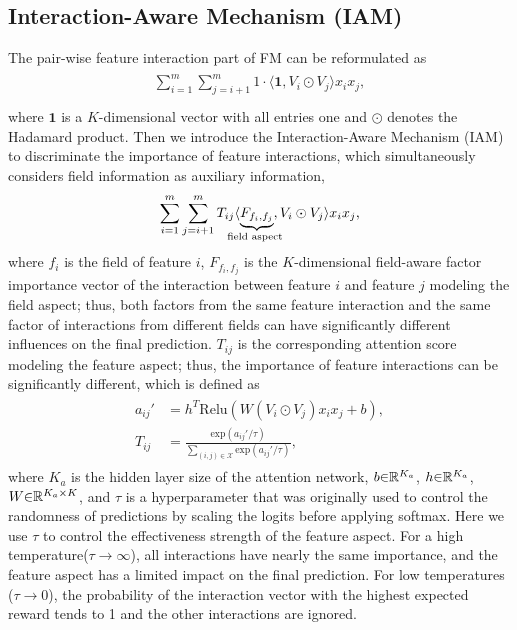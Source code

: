 \documentclass[letterpaper]{article} \usepackage{aaai19}  \usepackage{times}  \usepackage{helvet}  \usepackage{courier}  \usepackage{url}  \usepackage{graphicx}  \frenchspacing  \setlength{\pdfpagewidth}{8.5in}  \setlength{\pdfpageheight}{11in}  \usepackage{mathtools}
\begin{document}
\subsection{Interaction-Aware Mechanism (IAM)}
The pair-wise feature interaction part of FM can be reformulated as 
\begin{align}
\begin{split}
\sum_{i=1}^m\sum_{j=i+1}^{m} 1 \cdot \langle \mathbf{1}, V_i \odot V_j \rangle x_{i}x_{j}, \\ 
\end{split}
\label{eq:refm}
\end{align}
where $\mathbf{1}$ is a $K$-dimensional vector with all entries one and $\odot$ denotes the Hadamard product. Then we introduce the Interaction-Aware Mechanism (IAM) to discriminate the importance of feature interactions, which simultaneously considers field information as auxiliary information,
\begin{equation}
\sum_{i=1}^m\sum_{j=i+1}^{m}T_{ij}\langle \underbrace{F_{f_i,f_j}}_\text{\clap{field aspect~}}, V_i\odot V_j\rangle x_{i}x_{j} \text{,}
\label{eq:iam}
\end{equation}
where $f_i$ is the field of feature $i$, $F_{f_i,f_j}$ is the $K$-dimensional field-aware factor importance vector of the interaction between feature $i$ and feature $j$ modeling the field aspect; thus, both factors from the same feature interaction and the same factor of interactions from different fields can have significantly different influences on the final prediction. $T_{ij}$ is the corresponding attention score modeling the feature aspect; thus, the importance of feature interactions can be significantly different, which is defined as
\begin{align}
\begin{split}
a_{ij}'&=h^T\mathrm{Relu}(W(V_i \odot V_j)x_i x_j + b), \\
T_{ij}&=\frac{\text{exp}(a_{ij}' / \tau)}{\sum_{(i,j)\in \mathcal{X}}\text{exp}(a_{ij}' / \tau)},
\end{split}
\label{eq:t}
\end{align}
where $K_a$ is the hidden layer size of the attention network, $b\text{\ensuremath{\in}}\mathbb{R}^{K_a}$, $h\text{\ensuremath{\in}}\mathbb{R}^{K_a}$, $W\text{\ensuremath{\in}}\mathbb{R}^{K_a\times K}$, and $\tau$ is a hyperparameter that was originally used to control the randomness of predictions by scaling the logits before applying softmax\cite{hinton2015distilling}. Here we use $\tau$ to control the effectiveness strength of the feature aspect. For a high temperature($\tau \to \infty$), all interactions have nearly the same importance, and the feature aspect has a limited impact on the final prediction. For low temperatures ($\tau \to 0$), the probability of the interaction vector with the highest expected reward tends to 1 and the other interactions are ignored.
\end{document}
